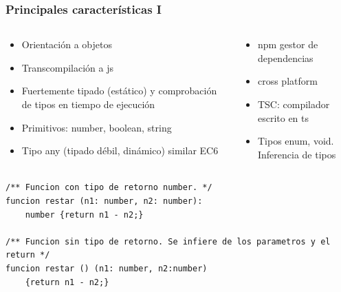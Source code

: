 \documentclass{beamer}
\begin{document}
\begin{frame}[fragile]
\frametitle{Principales características I}

\small
\begin{columns}[T]
	\begin{column}[T]{.5\textwidth} %
		
		\begin{itemize}
			\item Orientación a objetos
			\item Transcompilación a js 
			\item Fuertemente tipado (estático) y comprobación de tipos en tiempo de ejecución
			\item Primitivos: number, boolean, string
			\item Tipo any (tipado débil, dinámico) similar EC6
		\end{itemize}
		
		
	\end{column}
	\begin{column}[T]{0.5\textwidth} %
		\begin{itemize}
			\item npm gestor de dependencias
			\item cross platform
			\item TSC: compilador escrito en ts
			\item Tipos enum, void. Inferencia de tipos
		\end{itemize}

	\end{column}
\end{columns}

\tiny
 \begin{lstlisting}[style=customc, frame=single]
/** Funcion con tipo de retorno number. */
funcion restar (n1: number, n2: number): 
	number {return n1 - n2;}
	
/** Funcion sin tipo de retorno. Se infiere de los parametros y el return */
funcion restar () (n1: number, n2:number)
	{return n1 - n2;}
\end{lstlisting}


\end{frame}
\end{document}
